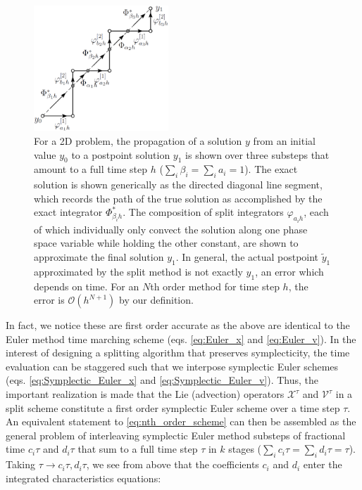 \documentclass[11pt,titlepage]{report}
\begin{document}
 \begin{figure}[h!]
  \centering
    \includegraphics[width=0.45\textwidth]{graphics/split_methods_nstep}
  \caption{For a 2D problem, the propagation of a solution $y$ from an initial value $y_0$ to a postpoint solution $y_1$ is shown over three substeps that amount to a full time step $h$ ($\sum_i \beta_i = \sum_i a_i = 1$). The exact solution is shown generically as the directed diagonal line segment, which records the path of the true solution as accomplished by the exact integrator $\Phi_{\beta_i h}^*$. The composition of split integrators $\varphi_{a_i h}$, each of which individually only convect the solution along one phase space variable while holding the other constant, are shown to approximate the final solution $y_1$. In general, the actual postpoint $\tilde{y}_1$ approximated by the split method is not exactly $y_1$, an error which depends on time. For an $N$th order method for time step $h$, the error is $\mathcal{O}(h^{N+1})$ by our definition.}
  \label{fig:n_step_split_diagram}
\end{figure}


 In fact, we notice these are first order accurate as the above are identical to the Euler method time marching scheme (eqs. \eqref{eq:Euler_x} and \eqref{eq:Euler_v}). In the interest of designing a splitting algorithm that preserves symplecticity, the time evaluation can be staggered such that we interpose symplectic Euler schemes (eqs. \eqref{eq:Symplectic_Euler_x} and \eqref{eq:Symplectic_Euler_v}). Thus, the important realization is made that the Lie (advection) operators $\mathcal{X}^{\tau}$ and $\mathcal{V}^{\tau}$ in a split scheme constitute a first order symplectic Euler scheme over a time step $\tau$. An equivalent statement to \eqref{eq:nth_order_scheme} can then be assembled as the general problem of interleaving symplectic Euler method substeps of fractional time $c_i\tau$ and $d_i\tau$ that sum to a full time step $\tau $ in $k$ stages ($\sum_i c_i \tau = \sum_i d_i \tau = \tau$). Taking $\tau \rightarrow c_i\tau , d_i\tau$, we see from above that the coefficients $c_i$ and $d_i$ enter the integrated characteristics equations:
\end{document}

